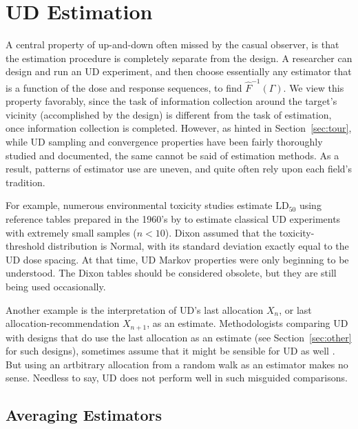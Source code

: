 
\section{UD Estimation}\label{sec:est}

A central property of up-and-down often missed by the casual observer, is that the estimation procedure is completely separate from the design. A researcher can design and run an UD experiment, and then choose essentially any estimator that is a function of the dose and response sequences, to find $\hat{F}^{-1}(\Gamma)$. We view this property favorably, since the task of information collection around the target's vicinity (accomplished by the design) is different from the task of estimation, once information collection is completed. However, as hinted in Section~\ref{sec:tour}, while UD sampling and convergence properties have been fairly thoroughly studied and documented, the same cannot be said of estimation methods. As a result, patterns of estimator use are uneven, and quite often rely upon each field's tradition.

For example, numerous environmental toxicity studies \citep{Lich:updo:1998,Sund:Patr:Jull:Warn:Use:2004,Sween:etal:canines:2010} estimate LD$_{50}$ using reference tables prepared in the 1960's by \cite{Dixo:up-a:1965} to estimate classical UD experiments with extremely small samples ($n<10$). Dixon assumed that the toxicity-threshold distribution is Normal, with its standard deviation exactly equal to the UD dose spacing. At that time, UD Markov properties were only beginning to be understood. The Dixon tables should be considered obsolete, but they are still being used occasionally.

Another example is the interpretation of UD's last allocation $X_n$, or last allocation-recommendation $X_{n+1}$, as an estimate.  Methodologists comparing UD with designs that do use the last allocation as an estimate (see Section~\ref{sec:other} for such designs), sometimes assume that it might be sensible for UD as well \citep{O'Qu:Chev:meth:1991,Zack:stag:2009}. But using an artbitrary allocation from a random walk as an estimator makes no sense. Needless to say, UD does not perform well in such misguided comparisons.

\subsection{Averaging Estimators}\label{sec:averaging}

